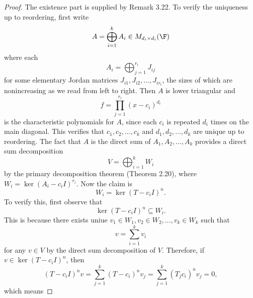 \documentclass[linearalgebraII]{subfiles}
\begin{document}
    \begin{proof}
        The existence part is supplied by Remark 3.22. To verify the uniqueness up to reordering, first write
        \begin{equation*}
            A = \bigoplus^{k}_{i=1} A_i\in M_{d_i\times d_i}(\F) 
        \end{equation*}
        where each
        \begin{equation*}
            A_i = \bigoplus^{r_i}_{j=1} J_{ij}
        \end{equation*}
        for some elementary Jordan matrices $J_{i 1}, J_{i 2}, \ldots, J_{ir_i}$, the sizes of which are nonincreasing as we read from left to right. Then $A$ is lower triangular and
        \begin{equation*}
            f = \prod^{r_i}_{j=1} \left( x-c_i \right) ^{d_i}
        \end{equation*}
        is the characteristic polynomials for $A$, since each $c_i$ is repeated $d_i$ times on the main diagonal. This verifies that $c_1,c_2,\ldots,c_k$ and $d_1,d_2,\ldots,d_k$ are unique up to reordering. The fact that $A$ is the direct sum of $A_1,A_2,\ldots,A_k$ provides a direct sum decomposition
        \begin{equation*}
            V = \bigoplus^{k}_{i=1} W_i
        \end{equation*}
        by the primary decomposition theorem (Theorem 2.20), where $W_i = \ker\left( A_i-c_iI \right) ^{r_i}$. Now the claim is
        \begin{equation*}
            W_i = \ker\left( T-c_iI \right) ^n.
        \end{equation*}
        To verify this, first observe that
        \begin{equation*}
            \ker\left( T-c_iI \right) ^n \subseteq W_i.
        \end{equation*}
        This is because there exists uniue $v_1\in W_1, v_2\in W_2,\ldots, v_k\in W_k$ such that
        \begin{equation*}
            v = \sum^{k}_{i=1} v_i
        \end{equation*}
        for any $v\in V$ by the direct sum decomposition of $V$. Therefore, if $v\in\ker\left( T-c_iI \right) ^n$, then
        \begin{equation*}
            \left( T-c_iI \right) ^nv = \sum^{k}_{j=1} \left( T-c_i \right)^nv_j = \sum^{k}_{j=1} \left( T_jc_i \right)^n v_j = 0, 
        \end{equation*}
        which means

\end{proof}
\end{document}
